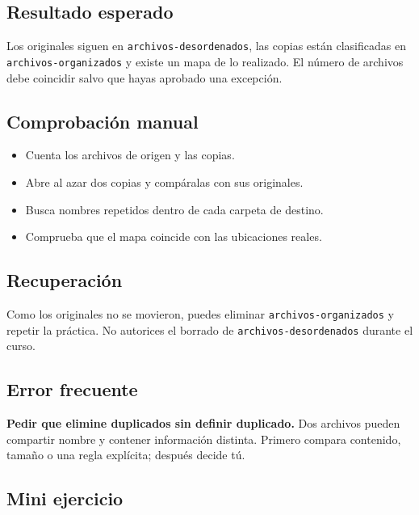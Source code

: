 \documentclass[10pt,a4paper,openany]{book}
\providecommand{\tightlist}{\setlength{\itemsep}{0.18em}\setlength{\parskip}{0pt}}
\begin{document}
\subsection{Resultado esperado}\label{resultado-esperado-3}

Los originales siguen en \texttt{archivos-desordenados}, las copias
están clasificadas en \texttt{archivos-organizados} y existe un mapa de
lo realizado. El número de archivos debe coincidir salvo que hayas
aprobado una excepción.

\subsection{Comprobación manual}\label{comprobaciuxf3n-manual-3}

\begin{itemize}
\tightlist
\item
  Cuenta los archivos de origen y las copias.
\item
  Abre al azar dos copias y compáralas con sus originales.
\item
  Busca nombres repetidos dentro de cada carpeta de destino.
\item
  Comprueba que el mapa coincide con las ubicaciones reales.
\end{itemize}

\subsection{Recuperación}\label{recuperaciuxf3n-4}

Como los originales no se movieron, puedes eliminar
\texttt{archivos-organizados} y repetir la práctica. No autorices el
borrado de \texttt{archivos-desordenados} durante el curso.

\subsection{Error frecuente}\label{error-frecuente-6}

\textbf{Pedir que elimine duplicados sin definir duplicado.} Dos
archivos pueden compartir nombre y contener información distinta.
Primero compara contenido, tamaño o una regla explícita; después decide
tú.

\subsection{Mini ejercicio}\label{mini-ejercicio-3}
\end{document}
